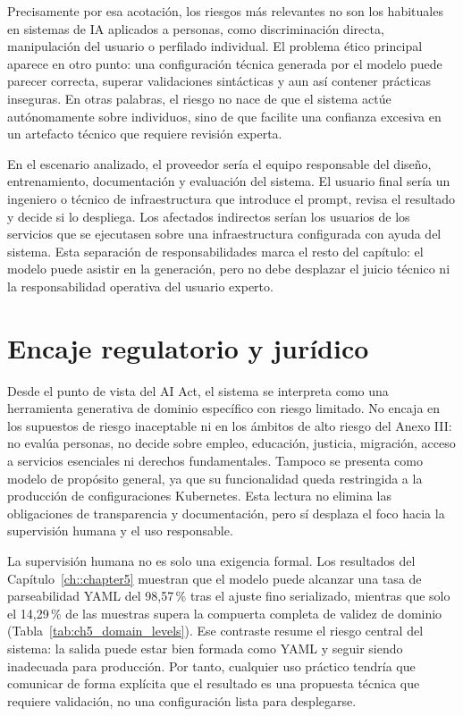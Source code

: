 Precisamente por esa acotación, los riesgos más relevantes no son los habituales en sistemas
de IA aplicados a personas, como discriminación directa, manipulación del usuario o perfilado
individual. El problema ético principal aparece en otro punto: una configuración técnica
generada por el modelo puede parecer correcta, superar validaciones sintácticas y aun así
contener prácticas inseguras. En otras palabras, el riesgo no nace de que el sistema actúe
autónomamente sobre individuos, sino de que facilite una confianza excesiva en un artefacto
técnico que requiere revisión experta.

En el escenario analizado, el proveedor sería el equipo responsable del diseño, entrenamiento,
documentación y evaluación del sistema. El usuario final sería un ingeniero o técnico de
infraestructura que introduce el prompt, revisa el resultado y decide si lo despliega. Los
afectados indirectos serían los usuarios de los servicios que se ejecutasen sobre una
infraestructura configurada con ayuda del sistema. Esta separación de responsabilidades marca
el resto del capítulo: el modelo puede asistir en la generación, pero no debe desplazar el
juicio técnico ni la responsabilidad operativa del usuario experto.


\section{Encaje regulatorio y jurídico}
\label{sec:ch8_aiact}

Desde el punto de vista del AI Act, el sistema se interpreta como una herramienta generativa de
dominio específico con riesgo limitado. No encaja en los supuestos de riesgo inaceptable ni en
los ámbitos de alto riesgo del Anexo III: no evalúa personas, no decide sobre empleo,
educación, justicia, migración, acceso a servicios esenciales ni derechos fundamentales. Tampoco
se presenta como modelo de propósito general, ya que su funcionalidad queda restringida a la
producción de configuraciones Kubernetes. Esta lectura no elimina las obligaciones de
transparencia y documentación, pero sí desplaza el foco hacia la supervisión humana y el uso
responsable.

La supervisión humana no es solo una exigencia formal. Los resultados del
Capítulo~\ref{ch::chapter5} muestran que el modelo puede alcanzar una tasa de parseabilidad
YAML del 98{,}57\,\% tras el ajuste fino serializado, mientras que solo el 14{,}29\,\% de las
muestras supera la compuerta completa de validez de dominio
(Tabla~\ref{tab:ch5_domain_levels}). Ese contraste resume el riesgo central del sistema: la
salida puede estar bien formada como YAML y seguir siendo inadecuada para producción. Por tanto,
cualquier uso práctico tendría que comunicar de forma explícita que el resultado es una
propuesta técnica que requiere validación, no una configuración lista para desplegarse.


